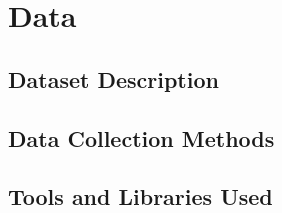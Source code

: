 \chapter{Data}
\label{cha:data}

\section{Dataset Description}
\label{sec:datasetdescription}


\section{Data Collection Methods}
\label{sec:datacollectionmethods}


\section{Tools and Libraries Used}
\label{sec:toolsandlibrariesused}



